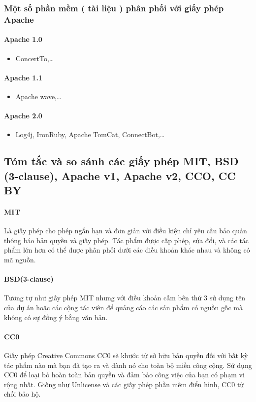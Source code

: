 \documentclass[12pt]{article}
\begin{document}
\subsubsection{Một số phần mềm ( tài liệu ) phân phối với giấy phép Apache}
\paragraph{Apache 1.0}
\begin{itemize}
\item ConcertTo,… 
\end{itemize}

\paragraph{Apache 1.1}
\begin{itemize}
\item Apache wave,… 
\end{itemize}

\paragraph{Apache 2.0}
\begin{itemize}
\item  Log4j, IronRuby, Apache TomCat, ConnectBot,… 
\end{itemize}

\subsection{Tóm tắc và so sánh các giấy phép MIT, BSD (3-clause), Apache v1, Apache v2, CCO, CC BY}
\paragraph{MIT}
Là giấy phép cho phép ngắn hạn và đơn giản với điều kiện chỉ yêu cầu bảo quản thông báo bản quyền và giấy phép. Tác phẩm được cấp phép, sửa đổi, và các tác phẩm lớn hơn có thể được phân phối dưới các điều khoản khác nhau và không có mã nguồn.
\paragraph{BSD(3-clause)}
Tương tự như giấy phép MIT  nhưng với điều khoản cấm bên thứ 3 sử dụng tên của dự án hoặc các cộng tác viên để quảng cáo các sản phẩm có nguồn gốc mà không có sự đồng ý bằng văn bản.
\paragraph{CC0}
Giấy phép Creative Commons CC0 sẽ khước từ sở hữu bản quyền đối với bất kỳ tác phẩm nào mà bạn đã tạo ra và dành nó cho toàn bộ miền công cộng. Sử dụng CC0 để loại bỏ hoàn toàn bản quyền và đảm bảo công việc của bạn có phạm vi rộng nhất. Giống như Unlicense và các giấy phép phần mềm điển hình, CC0 từ chối bảo hộ.
\end{document}
